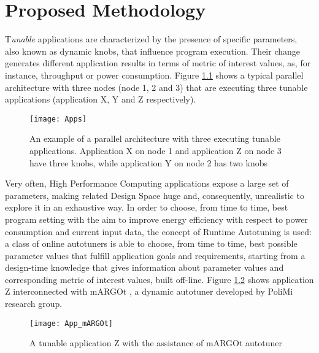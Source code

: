 \chapter{Proposed Methodology}\label{methodology}

\lettrine{T}{}\textit{unable} applications are characterized by the presence of specific parameters, also known as dynamic knobs, that influence program execution. Their change generates different application results in terms of metric of interest values, as, for instance, throughput or power consumption. Figure \ref{fig::appDef} shows a typical parallel architecture with three nodes (node 1, 2 and 3) that are executing three tunable applications (application X, Y and Z respectively).

\begin{figure}[htb]

    \centering
    \texttt{[image: Apps]}

    \caption[An example of a parallel architecture with tunable applications]{An example of a parallel architecture with three executing tunable applications. Application X on node 1 and application Z on node 3 have three knobs, while application Y on node 2 has two knobs}
    \label{fig::appDef}
    
\end{figure}

Very often, High Performance Computing applications expose a large set of parameters, making related Design Space huge and, consequently, unrealistic to explore it in an exhaustive way. In order to choose, from time to time, best program setting with the aim to improve energy efficiency with respect to power consumption and current input data, the concept of Runtime Autotuning is used: a class of online autotuners is able to choose, from time to time, best possible parameter values that fulfill application goals and requirements, starting from a design-time knowledge that gives information about parameter values and corresponding metric of interest values, built off-line. Figure \ref{fig::appAut} shows application Z interconnected with mARGOt \cite{gadioli2015application}, a dynamic autotuner developed by PoliMi research group.

\begin{figure}[htb]

    \centering
    \texttt{[image: App\_mARGOt]}
    \caption{A tunable application Z with the assistance of mARGOt autotuner}
    \label{fig::appAut}
    
\end{figure}

